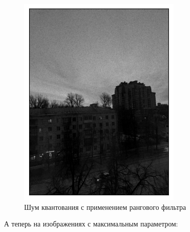 \documentclass[a4paper,12pt]{article}
\begin{document}
\begin{figure}[H]
\begin{minipage}{0.49\textwidth}
        \centering \includegraphics[width=\textwidth]{results/nlf_pois_3.png}
        \caption{Шум квантования с применением рангового фильтра}
    \end{minipage}
\end{figure}
А теперь на изображениях с максимальным параметром:
\end{document}

